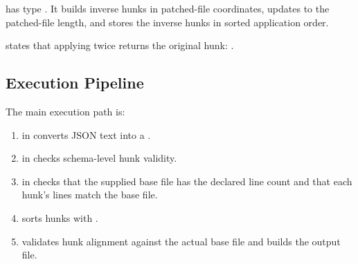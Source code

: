 \begin{definition}[invertDiff]
\code{[invertDiff]} has type . It builds inverse hunks in
patched-file coordinates, updates  to the patched-file
length, and stores the inverse hunks in sorted application order.
\end{definition}

\begin{theorem}
 states that applying  twice
returns the original hunk: .
\end{theorem}

\subsection{Execution Pipeline}

The main execution path is:

\begin{enumerate}
  \item {} in  converts JSON text into a
    .
  \item {} in  checks schema-level hunk
    validity.
  \item {} in  checks that the
    supplied base file has the declared line count and that each hunk's
     lines match the base file.
  \item {} sorts hunks with .
  \item {} validates hunk alignment against the actual
    base file and builds the output file.
\end{enumerate}

